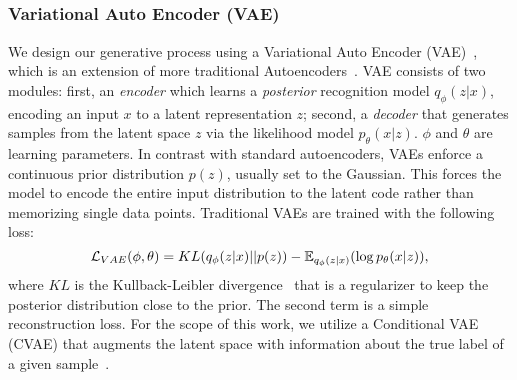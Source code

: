 
\subsection{}
\label{subsec:generation}
\subsubsection{Variational Auto Encoder (VAE)}
\label{subsub:vae}
We design our generative process using a Variational Auto Encoder (VAE)~\cite{kingma2013auto}, which is an extension of more traditional Autoencoders~\cite{hinton2006reducing}. VAE consists of two modules: first, an \textit{encoder} which learns a \textit{posterior} recognition model $q_{\phi}(z|x)$, encoding an input $x$ to a latent representation $z$; second, a \textit{decoder} that generates samples from the latent space $z$ via the likelihood model $p_{\theta}(x|z)$. $\phi$ and $\theta$ are learning parameters. 
In contrast with standard autoencoders, VAEs enforce a continuous prior distribution $p(z)$, usually set to the Gaussian. This forces the model to encode the entire input distribution to the latent code rather than memorizing single data points. 
Traditional VAEs are trained with the following loss:
\begin{equation} \small
    \mathcal{L}_{VAE}(\phi, \theta) = KL(q_{\phi}(z|x) || p(z)) %
    -\mathbb{E}_{q_{\phi}(z|x)}(\log p_{\theta}(x|z)), 
\end{equation}
where $KL$ is the Kullback-Leibler divergence~\cite{kullback1951information} that is a regularizer to keep the posterior distribution close to the prior. The second term is a simple reconstruction loss. 
For the scope of this work, we utilize a Conditional VAE (CVAE) that augments the latent space with information about the true label of a given sample~\cite{sohn2015learning}.  
%
